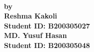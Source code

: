\begin{titlepage}
\begin{center}
%
%
%
\\
%
\vspace*{1cm}
\noindent \large \textbf{by} \\[-7pt]
\noindent \Large \textbf{Reshma Kakoli} \\ [-7pt]
\noindent \Large \textbf{Student ID: B200305027} \\

\noindent \Large \textbf{MD. Yusuf Hasan} \\ [-7pt]
\noindent \Large \textbf{Student ID: B200305048} \\


\end{center}
\end{titlepage}
